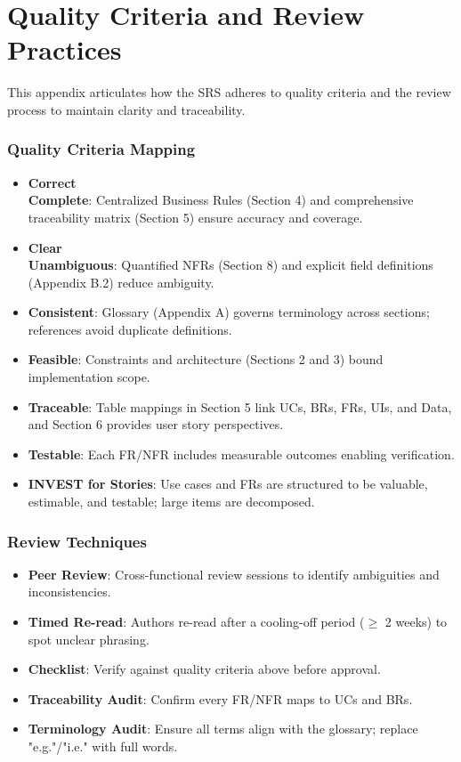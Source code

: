 \documentclass[12pt,a4paper]{article}
\begin{document}
\section{Quality Criteria and Review Practices}
This appendix articulates how the SRS adheres to quality criteria and the review process to maintain clarity and traceability.

\subsubsection{Quality Criteria Mapping}
\begin{itemize}
    \item \textbf{Correct \\ Complete}: Centralized Business Rules (Section 4) and comprehensive traceability matrix (Section 5) ensure accuracy and coverage.
    \item \textbf{Clear \\ Unambiguous}: Quantified NFRs (Section 8) and explicit field definitions (Appendix B.2) reduce ambiguity.
    \item \textbf{Consistent}: Glossary (Appendix A) governs terminology across sections; references avoid duplicate definitions.
    \item \textbf{Feasible}: Constraints and architecture (Sections 2 and 3) bound implementation scope.
    \item \textbf{Traceable}: Table mappings in Section 5 link UCs, BRs, FRs, UIs, and Data, and Section 6 provides user story perspectives.
    \item \textbf{Testable}: Each FR/NFR includes measurable outcomes enabling verification.
    \item \textbf{INVEST for Stories}: Use cases and FRs are structured to be valuable, estimable, and testable; large items are decomposed.
\end{itemize}

\subsubsection{Review Techniques}
\begin{itemize}
    \item \textbf{Peer Review}: Cross-functional review sessions to identify ambiguities and inconsistencies.
    \item \textbf{Timed Re-read}: Authors re-read after a cooling-off period (\(\geq\) 2 weeks) to spot unclear phrasing.
    \item \textbf{Checklist}: Verify against quality criteria above before approval.
    \item \textbf{Traceability Audit}: Confirm every FR/NFR maps to UCs and BRs.
    \item \textbf{Terminology Audit}: Ensure all terms align with the glossary; replace "e.g."/"i.e." with full words.
\end{itemize}
\end{document}
